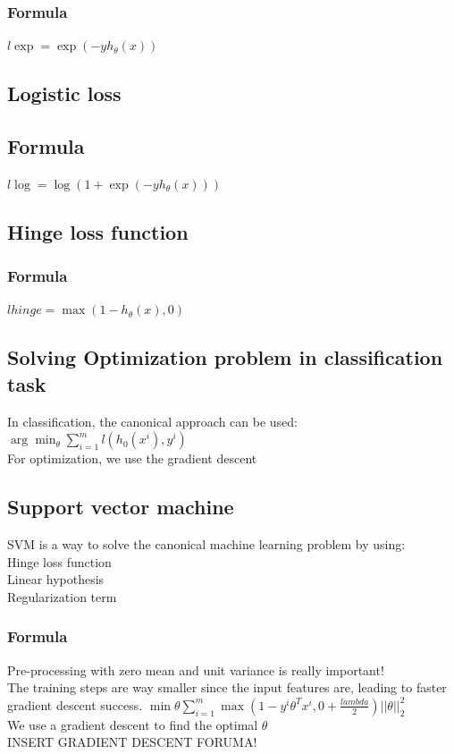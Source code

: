 \documentclass{article}
\begin{document}
\subsubsection{Formula}
$l\exp  = \exp (-yh_\theta(x))$
\subsection{Logistic loss}
\subsection{Formula}
$l\log  = \log (1+\exp (-yh_\theta(x)))$
\subsection{Hinge loss function}
\subsubsection{Formula}
$lhinge = \max({1 - h_\theta(x),0})$\\ 
\subsection{Solving Optimization problem in classification task}
In classification, the canonical approach can be used: 
\\$\arg\min_{\theta}\sum_{i = 1}^{m} l(h_0(x^i),y^i)$\\ 
For optimization, we use the gradient descent\\
\subsection{Support vector machine}
SVM is a way to solve the canonical machine learning problem by using: 
\\ Hinge loss function 
\\ Linear hypothesis
\\ Regularization term 
\subsubsection{Formula}
Pre-processing with zero mean and unit variance is really important!\\
The training steps are way smaller since the input features are, leading to faster gradient descent success.
$\min \theta \sum_{i = 1}^{m} \max ({1 - y^i \theta^Tx^i, 0} + \frac{lambda}{2}) | | \theta | |^2_2   $
\\ We use a gradient descent to find the optimal $\theta$
\\ INSERT GRADIENT DESCENT FORUMA!
\end{document}
